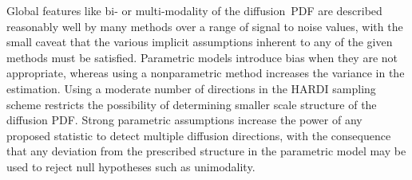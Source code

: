 \documentclass[dvips,aoas,preprint]{imsart}
\numberwithin{equation}{section}
\theoremstyle{plain}
\begin{document}


Global features like bi- or multi-modality of the diffusion~PDF are
described reasonably well by many methods over a
range of signal to noise values, with the small caveat that the
various implicit assumptions inherent to any of the given methods must
be satisfied.  Parametric models introduce bias when they are not
appropriate, whereas using a nonparametric method increases the
variance in the estimation.  Using a moderate number of directions in
the HARDI sampling scheme restricts the possibility of determining smaller
scale structure of the diffusion PDF.  Strong parametric assumptions increase the
power of any proposed statistic to detect multiple diffusion
directions, with the consequence that any deviation from the
prescribed structure in the parametric model may be used to reject
null hypotheses such as unimodality.  

\end{document}
